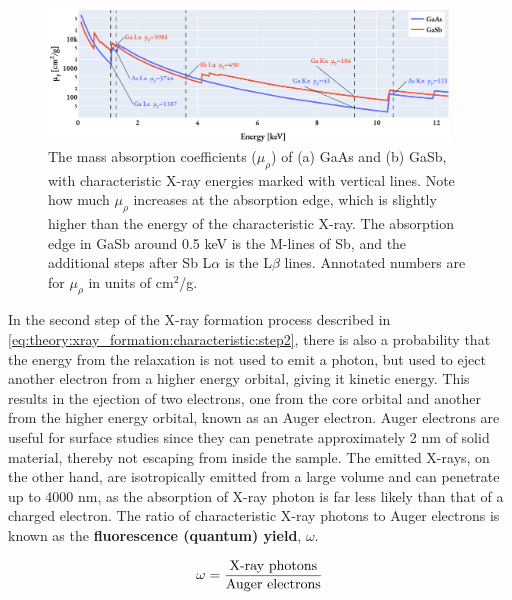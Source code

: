 \begin{figure}[phtb]
    \centering
    \includegraphics[width=0.95\textwidth]{figures/mass_absorption_coefficients.pdf}
    \caption{
        The mass absorption coefficients ($\mu_\rho$) of (a) GaAs and (b) GaSb, with characteristic X-ray energies marked with vertical lines.
        Note how much $\mu_\rho$ increases at the absorption edge, which is slightly higher than the energy of the characteristic X-ray.
        The absorption edge in GaSb around 0.5 keV is the M-lines of Sb, and the additional steps after Sb L$\alpha$ is the L$\beta$ lines.
        Annotated numbers are for $\mu_\rho$ in units of cm$^2$/g.
    }
    \label{fig:mass_absorption_coefficients}
\end{figure}


In the second step of the X-ray formation process described in \cref{eq:theory:xray_formation:characteristic:step2}, there is also a probability that the energy from the relaxation is not used to emit a photon, but used to eject another electron from a higher energy orbital, giving it kinetic energy.
This results in the ejection of two electrons, one from the core orbital and another from the higher energy orbital, known as an Auger electron.
Auger electrons are useful for surface studies since they can penetrate approximately 2 nm of solid material, thereby not escaping from inside the sample.
The emitted X-rays, on the other hand, are isotropically emitted from a large volume and can penetrate up to 4000 nm, as the absorption of X-ray photon is far less likely than that of a charged electron. %
The ratio of characteristic X-ray photons to Auger electrons is known as the \textbf{fluorescence (quantum) yield}, $\omega$.

\begin{equation}
    \label{eq:theory:theoreticalxray:yield}
    \omega = \frac{\textnormal{X-ray photons}}{\textnormal{Auger electrons}}
\end{equation}

